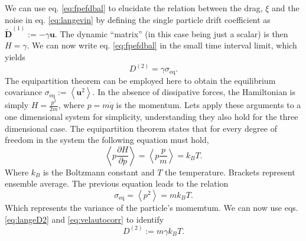 \documentclass[ twoside,openright,titlepage,numbers=noenddot,%
headinclude,footinclude,cleardoublepage=empty,abstract=on,
BCOR=5mm,paper=a4,fontsize=11pt, dvipsnames
]{scrreprt}
\renewcommand{\vec}[1]{\bm{#1}}
\newcommand{\kT}{k_B T}
\newcommand{\ppos}{q}
\newcommand{\pvel}{u}
\begin{document}
We can use eq. \eqref{eq:fpefdbal} to elucidate the relation between the drag, $\xi$ and the noise in eq. \eqref{eq:langevin} by defining the single particle drift coefficient as $\widetilde{\vec{D}}^{(1)} := -\gamma \vec{\pvel}$. The dynamic ``matrix'' (in this case being just a scalar) is then $H = \gamma$. We can now write eq. \eqref{eq:fpefdbal} in the small time interval limit, which yields
\begin{equation}
  \label{eq:langeD2}
  D^{(2)} = \gamma\sigma_{\text{eq}}.
\end{equation}
The equipartition theorem can be employed here to obtain the equilibrium covariance $\sigma_{\text{eq}} := \left\langle\vec{\pvel}^2\right\rangle$.
In the absence of dissipative forces, the Hamiltonian is simply $H = \frac{p^2}{2m}$, where $p = m\dot{\ppos}$ is the momentum.
Lets apply these arguments to a one dimensional system for simplicity, understanding they also hold for the three dimensional case. The equipartition theorem states that for every degree of freedom in the system the following equation must hold,
\begin{equation}
  \left\langle p \frac{\partial H}{\partial p}\right\rangle = \left\langle p \frac{p}{m}\right\rangle = k_BT.
\end{equation}
Where $k_B$ is the Boltzmann constant and $T$ the temperature. Brackets represent ensemble average.
The previous equation leads to the relation
\begin{equation}
  \label{eq:velautocorr}
  \sigma_{\text{eq}} = \left\langle p^2\right\rangle = m k_BT.
\end{equation}
Which represents the variance of the particle's momemtum. We can now use eqs. \eqref{eq:langeD2} and \eqref{eq:velautocorr} to identify
\begin{equation}
  \label{eq:langenoiseamp}
  D^{(2)} := m\gamma\kT.
\end{equation}
\end{document}
